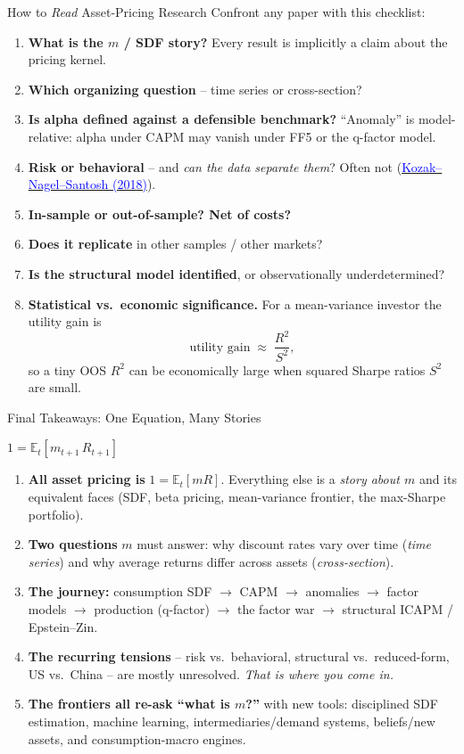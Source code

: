 \documentclass{beamer}
\newcommand{\E}{\mathbb{E}}
\begin{document}
\begin{frame}{How to \emph{Read} Asset-Pricing Research}
\small
Confront any paper with this checklist:
\begin{enumerate}
  \item \textbf{What is the $m$ / SDF story?} Every result is implicitly a claim about the pricing kernel.
  \item \textbf{Which organizing question} -- time series or cross-section?
  \item \textbf{Is alpha defined against a defensible benchmark?} ``Anomaly'' is model-relative: alpha under CAPM may vanish under FF5 or the q-factor model.
  \item \textbf{Risk or behavioral} -- and \emph{can the data separate them}? Often not (\href{https://doi.org/10.1111/jofi.12612}{\textcolor{blue}{Kozak--Nagel--Santosh (2018)}}).
  \item \textbf{In-sample or out-of-sample? Net of costs?}
  \item \textbf{Does it replicate} in other samples / other markets?
  \item \textbf{Is the structural model identified}, or observationally underdetermined?
  \item \textbf{Statistical vs.\ economic significance.} For a mean-variance investor the utility gain is
  \[
    \text{utility gain} \;\approx\; \frac{R^2}{S^2},
  \]
  so a tiny OOS $R^2$ can be economically large when squared Sharpe ratios $S^2$ are small.
\end{enumerate}
\end{frame}

\begin{frame}{Final Takeaways: One Equation, Many Stories}
\begin{tcolorbox}[colback=postit,colframe=red!60!black,title=\textbf{The whole course in one line}]
\centering\large $1=\E_t[m_{t+1}\,R_{t+1}]$
\end{tcolorbox}
\begin{enumerate}
  \item \textbf{All asset pricing is} $1=\E_t[mR]$. Everything else is a \emph{story about $m$} and its equivalent faces (SDF, beta pricing, mean-variance frontier, the max-Sharpe portfolio).
  \item \textbf{Two questions} $m$ must answer: why discount rates vary over time (\textit{time series}) and why average returns differ across assets (\textit{cross-section}).
  \item \textbf{The journey:} consumption SDF $\rightarrow$ CAPM $\rightarrow$ anomalies $\rightarrow$ factor models $\rightarrow$ production (q-factor) $\rightarrow$ the factor war $\rightarrow$ structural ICAPM / Epstein--Zin.
  \item \textbf{The recurring tensions} -- risk vs.\ behavioral, structural vs.\ reduced-form, US vs.\ China -- are mostly \alert{unresolved}. \emph{That is where you come in.}
  \item \textbf{The frontiers all re-ask ``what is $m$?''} with new tools: disciplined SDF estimation, machine learning, intermediaries/demand systems, beliefs/new assets, and consumption-macro engines.
\end{enumerate}
\end{frame}
\end{document}
